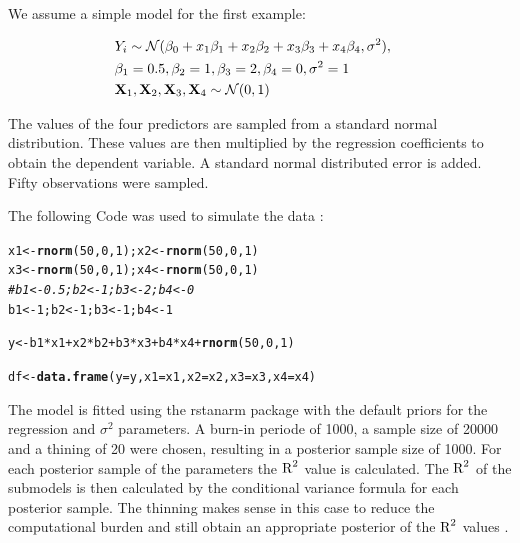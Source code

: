 \documentclass[11pt,a4paper,twoside]{book}\usepackage[]{graphicx}\usepackage[]{color}
\makeatletter
\newcommand{\hlnum}[1]{\textcolor[rgb]{0.686,0.059,0.569}{#1}}%
\newcommand{\hlcom}[1]{\textcolor[rgb]{0.678,0.584,0.686}{\textit{#1}}}%
\newcommand{\hlopt}[1]{\textcolor[rgb]{0,0,0}{#1}}%
\newcommand{\hlstd}[1]{\textcolor[rgb]{0.345,0.345,0.345}{#1}}%
\newcommand{\hlkwb}[1]{\textcolor[rgb]{0.69,0.353,0.396}{#1}}%
\newcommand{\hlkwc}[1]{\textcolor[rgb]{0.333,0.667,0.333}{#1}}%
\newcommand{\hlkwd}[1]{\textcolor[rgb]{0.737,0.353,0.396}{\textbf{#1}}}%
\newenvironment{kframe}{%
 \def\at@end@of@kframe{}%
 \ifinner\ifhmode%
  \def\at@end@of@kframe{\end{minipage}}%
  \begin{minipage}{\columnwidth}%
 \fi\fi%
 \def\FrameCommand##1{\hskip\@totalleftmargin \hskip-\fboxsep
 \colorbox{shadecolor}{##1}\hskip-\fboxsep
     \hskip-\linewidth \hskip-\@totalleftmargin \hskip\columnwidth}%
 \MakeFramed {\advance\hsize-\width
   \@totalleftmargin\z@ \linewidth\hsize
   \@setminipage}}%
 {\par\unskip\endMakeFramed%
 \at@end@of@kframe}
\newenvironment{knitrout}{}{} %
\makeatother
\begin{document}
We assume a simple model for the first example: 

\begin{align*} 
&Y_{i} \sim \mathcal{N}(\beta_{0}+x_{1} \beta_{1}+x_{2} \beta_{2}+x_{3} \beta_{3}+x_{4} \beta_{4}, \sigma^2),& \\ & \beta_{1} = 0.5, \beta_{2} = 1,  \beta_{3} = 2 , \beta_{4}=0, \sigma^2 = 1 & \\ & {\mathbf{X}}_{1}, {\mathbf{X}}_{2},{\mathbf{X}}_{3},{\mathbf{X}}_{4} \sim \mathcal{N}(0, 1) 
\end{align*} 


The values of the four predictors are sampled from a standard normal distribution. These values are then multiplied by the regression coefficients to obtain the dependent variable. A standard normal distributed error is added. Fifty observations were sampled.

The following Code was used to simulate the data :

\begin{knitrout}
\color{fgcolor}\begin{kframe}
\begin{alltt}
\hlstd{x1} \hlkwb{<-} \hlkwd{rnorm}\hlstd{(}\hlnum{50}\hlstd{,} \hlnum{0}\hlstd{,} \hlnum{1}\hlstd{); x2} \hlkwb{<-} \hlkwd{rnorm}\hlstd{(}\hlnum{50}\hlstd{,} \hlnum{0}\hlstd{,} \hlnum{1}\hlstd{)}
\hlstd{x3} \hlkwb{<-} \hlkwd{rnorm}\hlstd{(}\hlnum{50}\hlstd{,} \hlnum{0}\hlstd{,} \hlnum{1}\hlstd{); x4} \hlkwb{<-} \hlkwd{rnorm}\hlstd{(}\hlnum{50}\hlstd{,} \hlnum{0}\hlstd{,} \hlnum{1}\hlstd{)}
\hlcom{#b1 <- 0.5; b2 <- 1; b3 <- 2; b4 <- 0}
\hlstd{b1} \hlkwb{<-} \hlnum{1}\hlstd{; b2} \hlkwb{<-} \hlnum{1}\hlstd{; b3} \hlkwb{<-} \hlnum{1}\hlstd{; b4} \hlkwb{<-} \hlnum{1}

\hlstd{y} \hlkwb{<-} \hlstd{b1}\hlopt{*}\hlstd{x1} \hlopt{+} \hlstd{x2}\hlopt{*}\hlstd{b2} \hlopt{+} \hlstd{b3}\hlopt{*}\hlstd{x3} \hlopt{+} \hlstd{b4}\hlopt{*}\hlstd{x4} \hlopt{+} \hlkwd{rnorm}\hlstd{(}\hlnum{50}\hlstd{,} \hlnum{0}\hlstd{,} \hlnum{1}\hlstd{)}

\hlstd{df} \hlkwb{<-} \hlkwd{data.frame}\hlstd{(}\hlkwc{y} \hlstd{= y,} \hlkwc{x1} \hlstd{= x1,} \hlkwc{x2} \hlstd{= x2,} \hlkwc{x3} \hlstd{= x3,} \hlkwc{x4} \hlstd{= x4)}
\end{alltt}
\end{kframe}
\end{knitrout}


The model is fitted using the rstanarm package with the default priors for the regression and $\sigma^2$ parameters. A burn-in periode of 1000, a sample size of 20000 and a thining of 20 were chosen, resulting in a posterior sample size of 1000. For each posterior sample of the parameters the $\text{R}^2$ value is calculated. The $\text{R}^2$ of the submodels is then calculated by the conditional variance formula for each posterior sample. The thinning makes sense in this case to reduce the computational burden and still obtain an appropriate posterior of the $\text{R}^2$ values \citep{Link2012}. 
\end{document}
